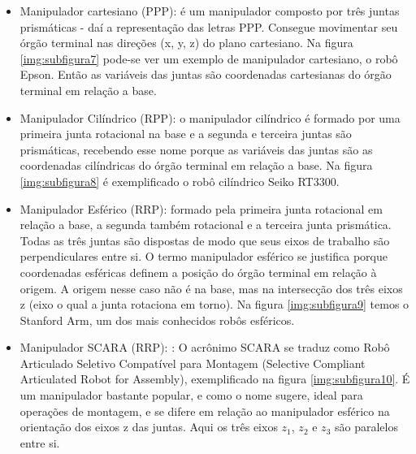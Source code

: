 \begin{itemize}
	\item Manipulador cartesiano (PPP): é um manipulador composto por três juntas prismáticas - daí a representação das letras PPP. Consegue movimentar seu órgão terminal nas direções (x, y, z) do plano cartesiano. Na figura \ref{img:subfigura7} pode-se ver um exemplo de manipulador cartesiano, o robô Epson. Então as variáveis das juntas são coordenadas cartesianas do órgão terminal em relação a base.		\

	\item Manipulador Cilíndrico (RPP): o manipulador cilíndrico é formado por uma primeira junta rotacional na base e a segunda e terceira juntas são prismáticas, recebendo esse nome porque as variáveis das juntas são as coordenadas cilíndricas do órgão terminal em relação a base. Na figura \ref{img:subfigura8} é exemplificado o robô cilíndrico Seiko RT3300.

	\item Manipulador Esférico (RRP): formado pela primeira junta rotacional em relação a
	base, a segunda também rotacional e a terceira junta prismática. Todas as três juntas
	são dispostas de modo que seus eixos de trabalho são perpendiculares entre si. O
	termo manipulador esférico se justifica porque coordenadas esféricas definem a
	posição do órgão terminal em relação à origem. A origem nesse caso não é na base,
	mas na intersecção dos três eixos z (eixo o qual a junta rotaciona em torno). Na figura
	\ref{img:subfigura9} temos o Stanford Arm, um dos mais conhecidos robôs esféricos.
		
	\item Manipulador SCARA (RRP): : O acrônimo SCARA se traduz como Robô Articulado
	Seletivo Compatível para Montagem (Selective Compliant Articulated Robot for
	Assembly), exemplificado na figura \ref{img:subfigura10}. É um manipulador bastante popular, e como o
	nome sugere, ideal para operações de montagem, e se difere em relação ao manipulador
	esférico na orientação dos eixos z das juntas. Aqui os três eixos $z_1$, $z_2$ e $z_3$ são
	paralelos entre si.


\end{itemize}
